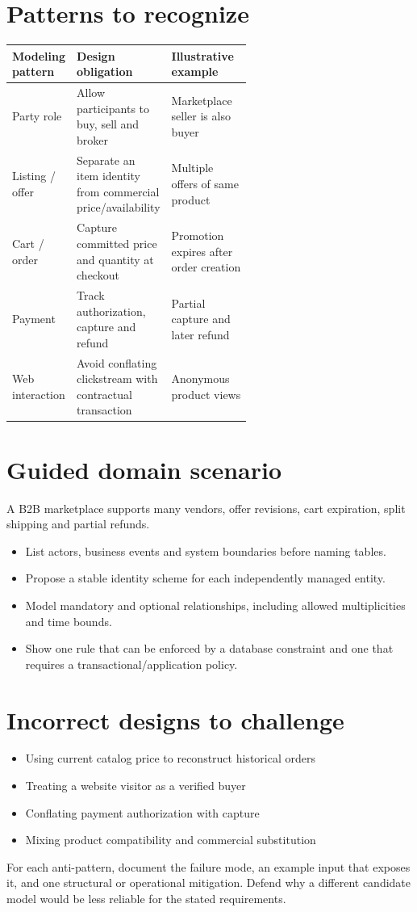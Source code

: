 \documentclass[11pt,letterpaper]{article}
\begin{document}
\section{Patterns to recognize}
\begin{tabularx}{\linewidth}{@{}>{\raggedright\arraybackslash}p{0.22\linewidth} >{\raggedright\arraybackslash}p{0.37\linewidth}>{\raggedright\arraybackslash}X@{}}
\toprule
\textbf{Modeling pattern} & \textbf{Design obligation} & \textbf{Illustrative example} \\ 
\midrule
Party role & Allow participants to buy, sell and broker & Marketplace seller is also buyer \\ 
Listing / offer & Separate an item identity from commercial price/availability & Multiple offers of same product \\ 
Cart / order & Capture committed price and quantity at checkout & Promotion expires after order creation \\ 
Payment & Track authorization, capture and refund & Partial capture and later refund \\ 
Web interaction & Avoid conflating clickstream with contractual transaction & Anonymous product views \\ 
\bottomrule
\end{tabularx}

\section{Guided domain scenario}
A B2B marketplace supports many vendors, offer revisions, cart expiration, split shipping and partial refunds.

\begin{itemize}
\item List actors, business events and system boundaries before naming tables.
\item Propose a stable identity scheme for each independently managed entity.
\item Model mandatory and optional relationships, including allowed multiplicities and time bounds.
\item Show one rule that can be enforced by a database constraint and one that requires a transactional/application policy.
\end{itemize}

\section{Incorrect designs to challenge}
\begin{itemize}
\item Using current catalog price to reconstruct historical orders
\item Treating a website visitor as a verified buyer
\item Conflating payment authorization with capture
\item Mixing product compatibility and commercial substitution
\end{itemize}
For each anti-pattern, document the failure mode, an example input that exposes it, and one structural or operational mitigation. Defend why a different candidate model would be less reliable for the stated requirements.
\end{document}
